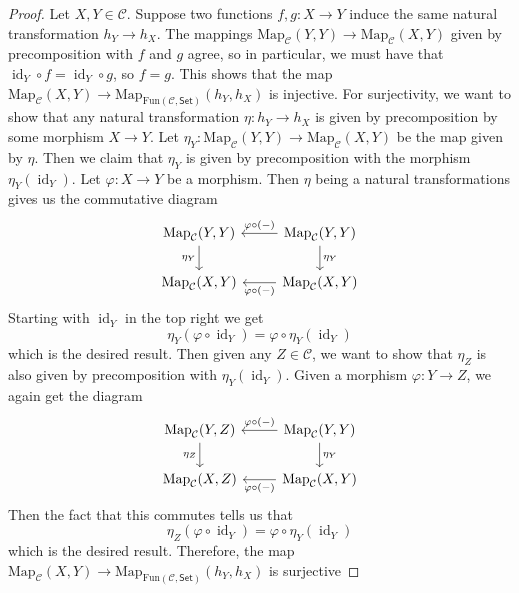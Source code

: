 \documentclass[psamsfonts, 12pt]{amsart}
\theoremstyle{definition}
\theoremstyle{remark}
\DeclareMathOperator{\id}{id}
\begin{document}
\begin{proof}
Let $X,Y \in \mathcal{C}$. Suppose two functions $f,g : X \to Y$ induce
the same natural transformation $h_Y \to h_X$. The mappings
$\mathrm{Map}_{\mathcal{C}}(Y,Y) \to \mathrm{Map}_{\mathcal{C}}(X,Y)$ given by
precomposition with $f$ and $g$ agree, so in particular, we must have that
$\id_Y \circ f = \id_Y \circ g$, so $f = g$. This shows that the map
$\mathrm{Map}_\mathcal{C}(X,Y)\to
\mathrm{Map}_{\mathrm{Fun}(\mathcal{C},\mathsf{Set})}(h_Y, h_X)$
is injective. For surjectivity, we want to show that any natural transformation
$\eta : h_Y \to h_X$ is given by precomposition by some morphism $X \to Y$. Let
$\eta_Y : \mathrm{Map}_{\mathcal{C}}(Y,Y) \to \mathrm{Map}_{\mathcal{C}}(X,Y)$
be the map given by $\eta$. Then we claim that $\eta_Y$ is given by precomposition
with the morphism $\eta_Y(\id_Y)$. Let $\varphi : X \to Y$ be a morphism.
Then $\eta$ being a natural transformations gives us the commutative
diagram
\[\begin{tikzcd}
\mathrm{Map}_{\mathcal{C}}(Y,Y) \ar[d,"\eta_Y"']
& \ar[l, "\varphi \circ (-)"'] \mathrm{Map}_{\mathcal{C}}(Y,Y) \ar[d, "\eta_Y"]\\
\mathrm{Map}_{\mathcal{C}}(X,Y)
& \mathrm{Map}_{\mathcal{C}}(X,Y) \ar[l,"\varphi \circ (-)"]
\end{tikzcd}\]
Starting with $\id_Y$ in the top right we get
\[
\eta_Y(\varphi \circ \id_Y) = \varphi \circ \eta_Y(\id_Y)
\]
which is the desired result. Then given any $Z \in \mathcal{C}$, we want to show
that $\eta_Z$ is also given by precomposition with $\eta_Y(\id_Y)$. Given
a morphism $\varphi : Y \to Z$, we again get the diagram
\[\begin{tikzcd}
\mathrm{Map}_{\mathcal{C}}(Y,Z) \ar[d,"\eta_Z"']
& \ar[l, "\varphi \circ (-)"'] \mathrm{Map}_{\mathcal{C}}(Y,Y) \ar[d, "\eta_Y"]\\
\mathrm{Map}_{\mathcal{C}}(X,Z)
& \mathrm{Map}_{\mathcal{C}}(X,Y) \ar[l,"\varphi \circ (-)"]
\end{tikzcd}\]
Then the fact that this commutes tells us that
\[
\eta_Z(\varphi \circ \id_Y) = \varphi \circ \eta_Y(\id_Y)
\]
which is the desired result. Therefore, the map $\mathrm{Map}_\mathcal{C}(X,Y)\to
\mathrm{Map}_{\mathrm{Fun}(\mathcal{C},\mathsf{Set})}(h_Y, h_X)$
is surjective
\end{proof}
%
\end{document}
